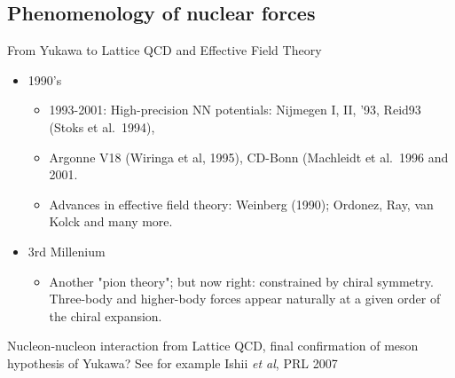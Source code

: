 \documentclass[%
twoside,                 %
final,                   %
10pt]{article}
\begin{document}
\subsection{Phenomenology of nuclear forces}
\begin{block}{From Yukawa to Lattice QCD and Effective Field Theory }

\begin{itemize}
\item 1990's
\begin{itemize}

  \item 1993-2001: High-precision NN potentials: Nijmegen I, II, '93, Reid93 (Stoks et al.~1994), 

  \item Argonne V18 (Wiringa et al, 1995), CD-Bonn (Machleidt et al.~1996 and 2001. 

  \item Advances in effective field theory: Weinberg (1990); Ordonez, Ray, van Kolck and many more.

\end{itemize}

\noindent
\item 3rd Millenium
\begin{itemize}

  \item Another "pion theory"; but now right: constrained by chiral symmetry. Three-body and higher-body forces appear naturally at a given order of the chiral expansion. 
\end{itemize}

\noindent
\end{itemize}

\noindent
Nucleon-nucleon interaction from Lattice QCD, final confirmation of meson hypothesis of Yukawa?  See for example Ishii \emph{et al}, PRL 2007
\end{block}


\end{document}

